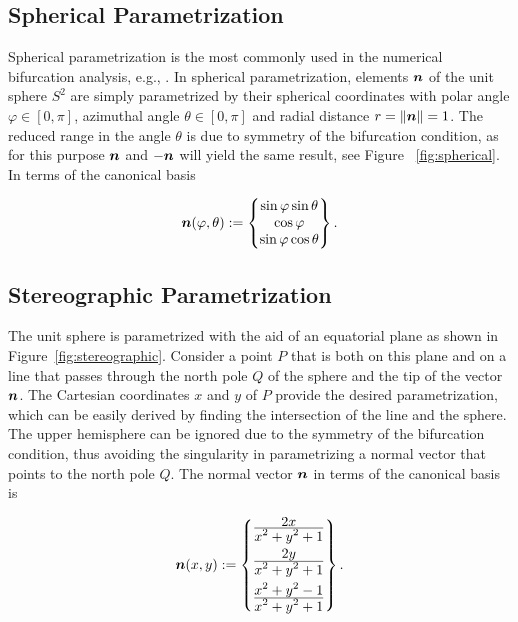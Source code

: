 \documentclass[12pt]{article}
\numberwithin{equation}{section}
\begin{document}
\subsection{Spherical Parametrization}
\label{subsec:spherical}

Spherical parametrization is the most commonly used in the numerical 
bifurcation analysis, e.g., \cite{Mosler:2005, Regueiro.Foster:2011}. 
In spherical parametrization, elements ${\boldsymbol{n}}$ of the unit sphere $S^2$ 
are simply parametrized by their spherical coordinates with polar 
angle $\varphi \in [0, \pi]$, azimuthal angle $\theta \in [0, \pi]$ 
and radial distance $r = \|{\boldsymbol{n}} \| = 1$. The reduced range in the angle 
$\theta$ is due to symmetry of the bifurcation condition, as for this 
purpose ${\boldsymbol{n}}$ and $- {\boldsymbol{n}}$ will yield the same result, see Figure~
\ref{fig:spherical}. In terms of the canonical basis

\begin{equation}
  {\boldsymbol{n}}(\varphi, \theta)
  :=
  \begin{Bmatrix}
    \sin\varphi \sin\theta
    \\
    \cos\varphi
    \\
    \sin\varphi \cos\theta
  \end{Bmatrix}.
\end{equation}

\subsection{Stereographic Parametrization}
\label{subsec:stereographic}

The unit sphere is parametrized with the aid of an equatorial plane as
shown in Figure~\ref{fig:stereographic}.  Consider a point $P$ that is
both on this plane and on a line that passes through the north pole
$Q$ of the sphere and the tip of the vector ${\boldsymbol{n}}$. The Cartesian
coordinates $x$ and $y$ of $P$ provide the desired parametrization,
which can be easily derived by finding the intersection of the line
and the sphere. The upper hemisphere can be ignored due to the
symmetry of the bifurcation condition, thus avoiding the singularity
in parametrizing a normal vector that points to the north pole
$Q$. The normal vector ${\boldsymbol{n}}$ in terms of the canonical basis is

\begin{equation}
  {\boldsymbol{n}}(x,y)
  := 
  \begin{Bmatrix}
    \frac{\displaystyle 2x}{\displaystyle x^2+y^2+1}
    \\[0.9em]
    \frac{\displaystyle 2y}{\displaystyle x^2+y^2+1}
    \\[0.9em]
    \frac{\displaystyle x^2+y^2-1}{\displaystyle x^2+y^2+1}
  \end{Bmatrix}.
\end{equation}
\end{document}
